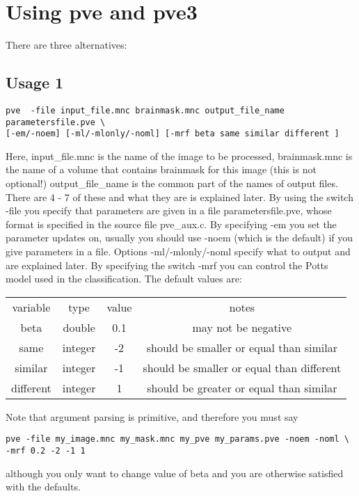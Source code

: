\documentclass{article}
\begin{document}
\section{Using pve and pve3}
There are three alternatives: \\

\subsection*{Usage 1}
\begin{verbatim}
pve  -file input_file.mnc brainmask.mnc output_file_name parametersfile.pve \
[-em/-noem] [-ml/-mlonly/-noml] [-mrf beta same similar different ]
\end{verbatim}
Here, input\_file.mnc is the name of the image to be processed,
brainmask.mnc is the name of  a
volume that contains brainmask for this image (this is not optional!)
output\_file\_name is the common part of the names of output
files. There are 4 - 7 of these and what they are is explained later.
By using the switch -file you specify that parameters are given in a
file parametersfile.pve, whose format is specified in the source file
pve\_aux.c. By specifying -em you set the parameter updates on, usually 
you should use -noem (which is the default) if you give parameters in
a file. Options -ml/-mlonly/-noml specify what to output and are
explained later. By specifying the switch -mrf you can control the
Potts model used in the classification. The default values are:

\begin{center}
\begin{tabular}{c|c|c|c}
variable & type & value & notes \\
beta & double & 0.1   &  may not be negative \\
same & integer & -2   & should be smaller or equal than similar \\
similar & integer & -1 & should be smaller or equal than different \\
different & integer & 1 & should be greater or equal than similar \\
\end{tabular}
\end{center}

Note that argument parsing is primitive, and therefore you must say
\begin{verbatim}
pve -file my_image.mnc my_mask.mnc my_pve my_params.pve -noem -noml \
-mrf 0.2 -2 -1 1
\end{verbatim}
although you only want to change value of beta and you are otherwise
satisfied with the defaults.
\end{document}
